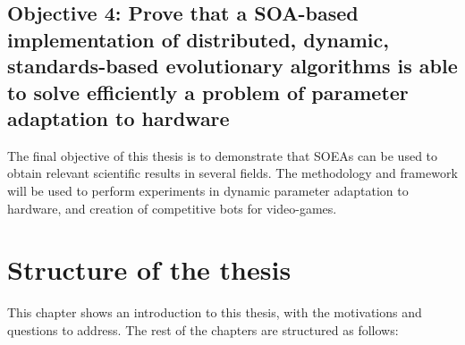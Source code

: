 \newcommand{\objectiveresearch}{Prove that a SOA-based implementation of distributed, dynamic, standards-based evolutionary algorithms is able to solve efficiently a problem of parameter adaptation to hardware} %
\subsection*{Objective 4: \objectiveresearch}
\label{subsec:intro:obj:applications}
The final objective of this thesis is to demonstrate that SOEAs can be used to obtain relevant scientific results in several fields. The methodology and framework will be used to perform experiments in dynamic parameter adaptation to hardware, and creation of competitive bots for video-games. %



\section{Structure of the thesis}
\label{sec:intro:structure}

This chapter shows an introduction to this thesis, with the
motivations and questions to address. %
The rest of the chapters are structured as follows:


